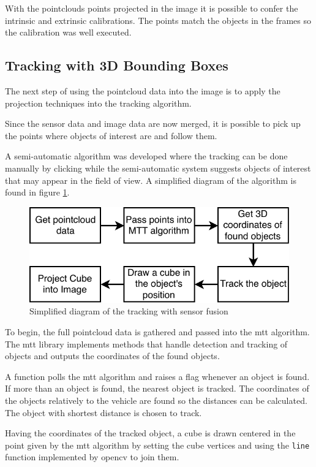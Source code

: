 With the pointclouds points projected in the image it is possible to confer the intrinsic and extrinsic calibrations. The points match the objects in the frames so the calibration was well executed.


\subsection{Tracking with 3D Bounding Boxes}

The next step of using the pointcloud data into the image is to apply the projection techniques into the tracking algorithm.

Since the sensor data and image data are now merged, it is possible to pick up the points where objects of interest are and follow them.

A semi-automatic algorithm was developed where the tracking can be done manually by clicking while the semi-automatic system suggests objects of interest that may appear in the field of view. A simplified diagram of the algorithm is found in figure \ref{fig:bbdiagram}.

\begin{figure}[htp]
	
	\centering
	\includegraphics[width=.6\textwidth]{caplabel/imgs/bbdiagram.pdf}
	
	\caption{Simplified diagram of the tracking with sensor fusion}
	\label{fig:bbdiagram}
	
\end{figure}

To begin, the full pointcloud data is gathered and passed into the \gls{mtt} algorithm. The \gls{mtt} library implements methods that handle detection and tracking of objects and outputs the coordinates of the found objects. 

A function polls the \gls{mtt} algorithm and raises a flag whenever an object is found. If more than an object is found, the nearest object is tracked. The coordinates of the objects relatively to the vehicle are found so the distances can be calculated. The object with shortest distance is chosen to track.

Having the coordinates of the tracked object, a cube is drawn centered in the point given by the \gls{mtt} algorithm by setting the cube vertices and using the \texttt{line} function implemented by \gls{opencv} to join them.

